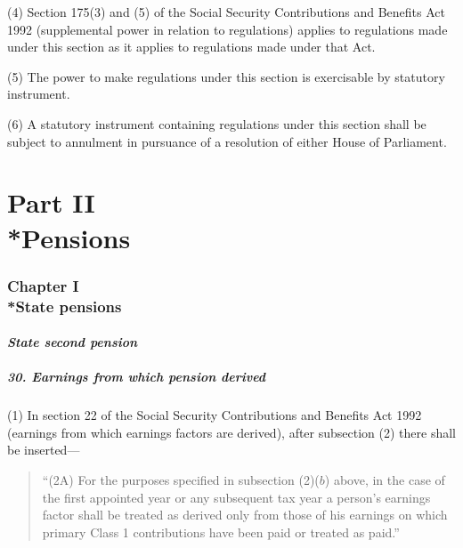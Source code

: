 \documentclass[12pt,a4paper]{article}
\begin{document}
(4) Section 175(3)  and (5)  of the Social Security Contributions and Benefits Act 1992 (supplemental power in relation to regulations) applies to regulations made under this section as it applies to regulations made under that Act.

(5) The power to make regulations under this section is exercisable by statutory instrument.

(6) A statutory instrument containing regulations under this section shall be subject to annulment in pursuance of a resolution of either House of Parliament.


\part[Part II --- Pensions]{Part II\\*Pensions}


\section[Chapter I --- State pensions]{Chapter I\\*State pensions}

\renewcommand\parthead{--- Part II Chapter I}

\subsection{\itshape State second pension}

\subsubsection{30. Earnings from which pension derived}

(1) In section 22 of the Social Security Contributions and Benefits Act 1992 (earnings from which earnings factors are derived), after subsection (2)  there shall be inserted—
\begin{quotation}
“(2A) For the purposes specified in subsection (2)($b$)  above, in the case of the first appointed year or any subsequent tax year a person’s earnings factor shall be treated as derived only from those of his earnings on which primary Class 1 contributions have been paid or treated as paid.”
\end{quotation}
\end{document}
